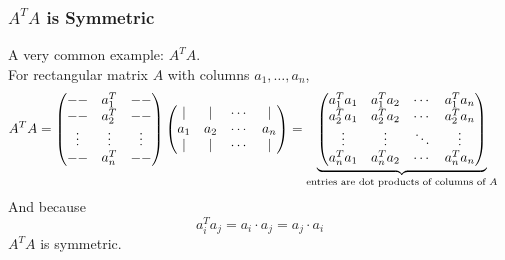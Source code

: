 \begin{frame}\frametitle{$A^TA$ is Symmetric}
    A very common example: $A^TA$. \\[6pt] \pause For  rectangular matrix $ A $ with columns $ a_1 ,\dotsc, a_n$, 
    \begin{align*}
    A ^{T} A& = 
    \begin{pmatrix}
    \---  & a_1 ^{T} & \--- 
    \\
    \---  & a_2 ^{T} & \--- 
    \\
    \vdots & \vdots & \vdots  
    \\
    \---  & a_n ^{T} & \--- 
    \end{pmatrix}
    \begin{pmatrix}
    \vert & \vert & \cdots & \vert \\ 
    a_1 & a_2 & \cdots & a_n 
    \\ 
    \vert & \vert & \cdots & \vert 
    \end{pmatrix}
    = \underbrace{
    \begin{pmatrix}
    a_1 ^{T} a_1 & a_1 ^{T} a_2 & \cdots & a_1 ^{T} a_n 
    \\
    a_2 ^T a_1 & a_2 ^{T} a_2  &  \cdots & a_2 ^{T}a_n 
    \\
    \vdots   & \vdots & \ddots & \vdots 
    \\
    a_n ^T a_1 & a_n ^{T} a_2  &  \cdots & a_n ^{T}a_n 
    \end{pmatrix} } _{\textup{entries are dot products of columns of $A$}} 
\end{align*}
\pause 
And because $$a_i^T a_j = a_i \cdot a_j = a_j \cdot a_i$$ $A^TA$ is symmetric. 
\end{frame}






